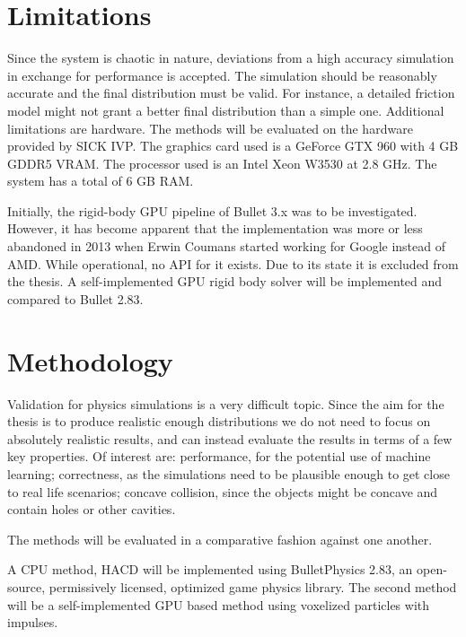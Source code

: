 \section{Limitations}
Since the system is chaotic in nature, deviations from a high accuracy
simulation in exchange for performance is accepted. The simulation should be reasonably
accurate
and the final distribution must be valid. For instance, a detailed
friction model might not grant a better final distribution than a simple one.
Additional limitations are hardware. The methods will be evaluated on the hardware
provided by SICK IVP. The graphics card used is a GeForce GTX 960 with 4 GB GDDR5 VRAM.
The processor used is an Intel Xeon W3530 at 2.8 GHz.
The system has a total of 6 GB RAM.

Initially, the rigid-body GPU pipeline of Bullet 3.x was to be investigated. However,
it has become apparent that the implementation was more or less abandoned in 2013
when Erwin Coumans started working for Google instead of AMD. While operational,
no API for it exists. Due to its state it is excluded from the thesis.
A self-implemented GPU rigid body solver will be implemented and compared to Bullet 2.83.

\section{Methodology}
Validation for physics simulations is a very difficult topic. Since the aim for
the thesis is to produce realistic enough distributions we do not need to focus
on absolutely realistic results, and can instead evaluate the results in terms of
a few key properties. Of interest are: performance, for the potential use of machine learning; correctness,
as the simulations need to be plausible enough to get close to real life scenarios; concave collision, since the objects might
 be concave and contain holes or other cavities.

The methods will be evaluated in a comparative fashion against one another.

A CPU method, HACD will be implemented using
BulletPhysics 2.83, an open-source, permissively licensed, optimized game physics
library. The second method will be a self-implemented GPU based method using
voxelized particles with impulses.
